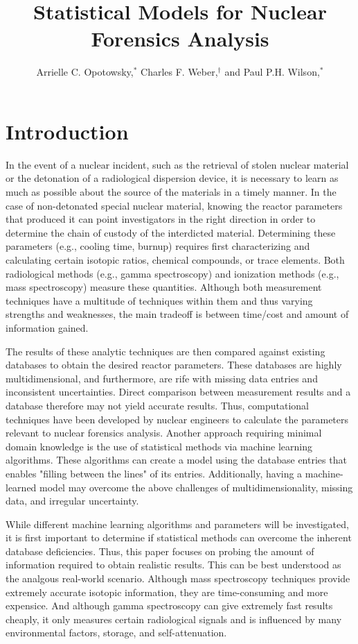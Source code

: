 \documentclass{anstrans}
\title{Statistical Models for Nuclear Forensics Analysis}
\author{Arrielle C. Opotowsky,$^{*}$ Charles F. Weber,$^{\dagger}$ and Paul P.H. Wilson,$^{*}$}
\institute{
$^{*}$Computational Nuclear Engineering Research Group, University of Wisconsin--Madison, Madison, WI, opotowsky@wisc.edu, paul.wilson@wisc.edu
\and
$^{\dagger}$Nuclear Security Modeling Group, Oak Ridge National Laboratory, Oak Ridge, TN, webercf@ornl.gov
}
\begin{document}
\section{Introduction}

In the event of a nuclear incident, such as the retrieval of stolen nuclear
material or the detonation of a radiological dispersion device, 
it is necessary to learn as much as
possible about the source of the materials in a timely manner. In the case of
non-detonated special nuclear material, knowing the reactor parameters that
produced it can point investigators in the right direction in order to
determine the chain of custody of the interdicted material. Determining these
parameters (e.g., cooling time, burnup) requires first characterizing and
calculating certain isotopic ratios, chemical compounds, or trace elements.
Both radiological methods (e.g., gamma spectroscopy) and ionization methods
(e.g., mass spectroscopy) measure these quantities. Although both measurement
techniques have a multitude of techniques within them and thus varying
strengths and weaknesses, the main tradeoff is between time/cost and amount of
information gained. 

The results of these analytic techniques are then compared against existing
databases to obtain the desired reactor parameters. These databases are highly
multidimensional, and furthermore, are rife with missing data entries and
inconsistent uncertainties. Direct comparison between measurement results and a
database therefore may not yield accurate results. Thus, computational
techniques have been developed by nuclear engineers to calculate the parameters
relevant to nuclear forensics analysis. Another approach requiring minimal domain knowledge is the use of
statistical methods via machine learning algorithms. These algorithms can
create a model using the database entries that enables "filling between the
lines" of its entries. Additionally, having a machine-learned model may
overcome the above challenges of multidimensionality, missing data, and
irregular uncertainty.

While different machine learning algorithms and parameters will be
investigated, it is first important to determine if statistical methods can
overcome the inherent database deficiencies. Thus, this paper focuses on
probing the amount of information required to obtain realistic results.  This
can be best understood as the analgous real-world scenario. Although mass
spectroscopy techniques provide extremely accurate isotopic information, they
are time-consuming and more expensice. And although gamma spectroscopy can give
extremely fast results cheaply, it only measures certain radiological signals
and is influenced by many environmental factors, storage, and self-attenuation.
\end{document}
